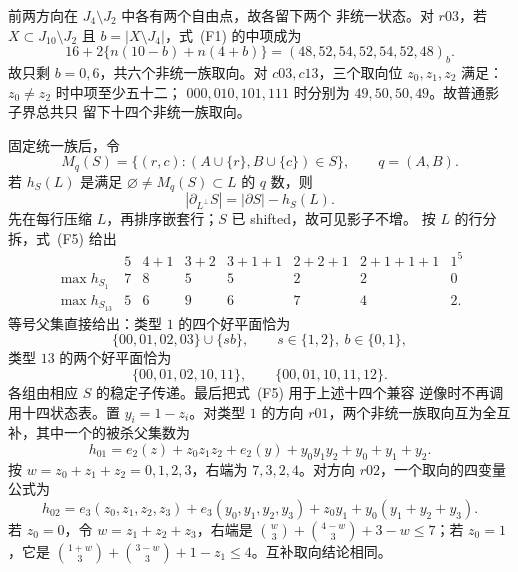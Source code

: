 前两方向在 \(J_4\setminus J_2\) 中各有两个自由点，故各留下两个
非统一状态。对 \(r03\)，若
\(X\subset J_{10}\setminus J_2\) 且
\(b=|X\setminus J_4|\)，式~(F1) 的中项成为
\[
16+2\{n(10-b)+n(4+b)\}
=(48,52,54,52,54,52,48)_b.                                  \tag{F4}
\]
故只剩 \(b=0,6\)，共六个非统一族取向。对 \(c03,c13\)，三个取向位
\(z_0,z_1,z_2\) 满足：\(z_0\ne z_2\) 时中项至少五十二；
\(000,010,101,111\) 时分别为 \(49,50,50,49\)。故普通影子界总共只
留下十四个非统一族取向。

固定统一族后，令
\[
M_q(S)=\{(r,c):(A\cup\{r\},B\cup\{c\})\in S\},\qquad q=(A,B).
\]
若 \(h_S(L)\) 是满足
\(\varnothing\ne M_q(S)\subset L\) 的 \(q\) 数，则
\[
|\partial_{L^\perp}S|=|\partial S|-h_S(L).                    \tag{F5}
\]
先在每行压缩 \(L\)，再排序嵌套行；\(S\) 已 shifted，故可见影子不增。
按 \(L\) 的行分拆，式~(F5) 给出
\[
\begin{array}{c|rrrrrrr}
&5&4+1&3+2&3+1+1&2+2+1&2+1+1+1&1^5\\ \hline
\max h_{S_1}&7&8&5&5&2&2&0\\
\max h_{S_{13}}&5&6&9&6&7&4&2.
\end{array}                                                     \tag{F6}
\]
等号父集直接给出：类型 \(1\) 的四个好平面恰为
\[
\{00,01,02,03\}\cup\{sb\},\qquad s\in\{1,2\},\ b\in\{0,1\},
\]
类型 \(13\) 的两个好平面恰为
\[
\{00,01,02,10,11\},\qquad \{00,01,10,11,12\}.
\]
各组由相应 \(S\) 的稳定子传递。最后把式~(F5) 用于上述十四个兼容
逆像时不再调用十四状态表。置 \(y_i=1-z_i\)。对类型 \(1\) 的方向
\(r01\)，两个非统一族取向互为全互补，其中一个的被杀父集数为
\[
h_{01}=e_2(z)+z_0z_1z_2+e_2(y)+y_0y_1y_2+y_0+y_1+y_2.
                                                                    \tag{F7a}
\]
按 \(w=z_0+z_1+z_2=0,1,2,3\)，右端为 \(7,3,2,4\)。对方向
\(r02\)，一个取向的四变量公式为
\[
h_{02}=e_3(z_0,z_1,z_2,z_3)+e_3(y_0,y_1,y_2,y_3)
 +z_0y_1+y_0(y_1+y_2+y_3).                                  \tag{F7b}
\]
若 \(z_0=0\)，令 \(w=z_1+z_2+z_3\)，右端是
\(\binom w3+\binom{4-w}3+3-w\le7\)；若 \(z_0=1\)，它是
\(\binom{1+w}3+\binom{3-w}3+1-z_1\le4\)。互补取向结论相同。

